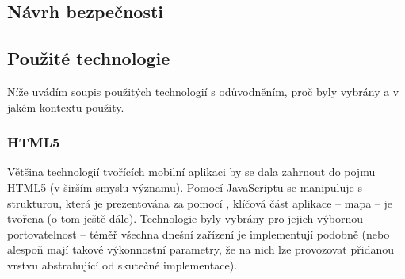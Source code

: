 % 
% 
% 

\subsection{Návrh bezpečnosti}


\subsection{Použité technologie}
Níže uvádím soupis použitých technologií s odůvodněním, proč byly vybrány a v jakém kontextu použity.

\subsubsection{HTML5}
Většina technologií tvořících mobilní aplikaci by se dala zahrnout do pojmu HTML5 (v širším smyslu významu). Pomocí JavaScriptu se manipuluje s  strukturou, která je prezentována za pomocí , klíčová část aplikace -- mapa -- je tvořena  (o tom ještě dále). Technologie byly vybrány pro jejich výbornou portovatelnost -- téměř všechna dnešní zařízení je implementují podobně (nebo alespoň mají takové výkonnostní parametry, že na nich lze provozovat přidanou vrstvu abstrahující od skutečné implementace).

